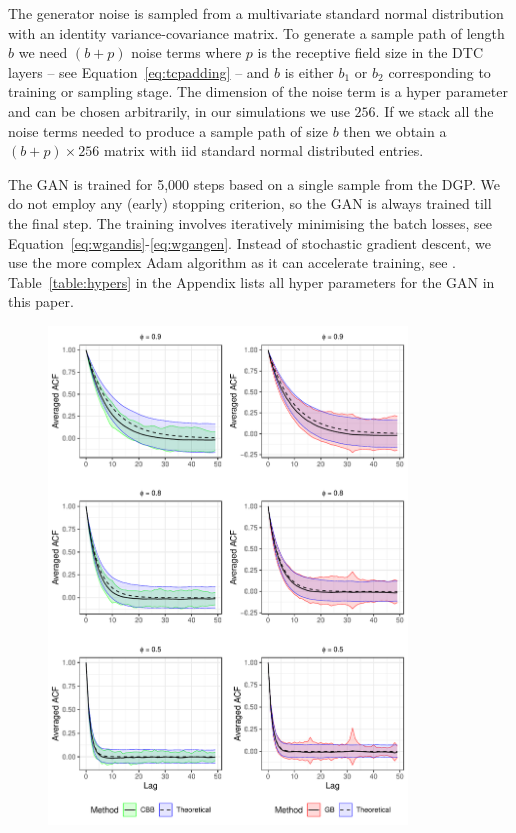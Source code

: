 \documentclass[12pt]{article}
\begin{document}
The generator noise is sampled from a multivariate standard normal distribution with an identity variance-covariance matrix. To generate a sample path of length $b$ we need $(b + p)$ noise terms where $p$ is the receptive field size in the DTC layers -- see Equation~\ref{eq:tcpadding} -- and $b$ is either $b_1$ or $b_2$ corresponding to training or sampling stage. The dimension of the noise term is a hyper parameter and can be chosen arbitrarily, in our simulations we use $256$. If we stack all the noise terms needed to produce a sample path of size $b$ then we obtain a $(b + p) \times 256$ matrix with iid standard normal distributed entries.

The GAN is trained for 5,000 steps based on a single sample from the DGP. We do not employ any (early) stopping criterion, so the GAN is always trained till the final step. The training involves iteratively minimising the batch losses, see Equation~\ref{eq:wgandis}-\ref{eq:wgangen}. Instead of stochastic gradient descent, we use the more complex Adam algorithm as it can accelerate training, see \citep{kingma2014adam}. Table~\ref{table:hypers} in the Appendix lists all hyper parameters for the GAN in this paper.

\begin{figure}[t!]
\centering
\hspace{-1em}\includegraphics[width=0.85\textwidth]{true_vs_acfs_page.pdf}
\label{figure:acf}
\end{figure}
\end{document}

